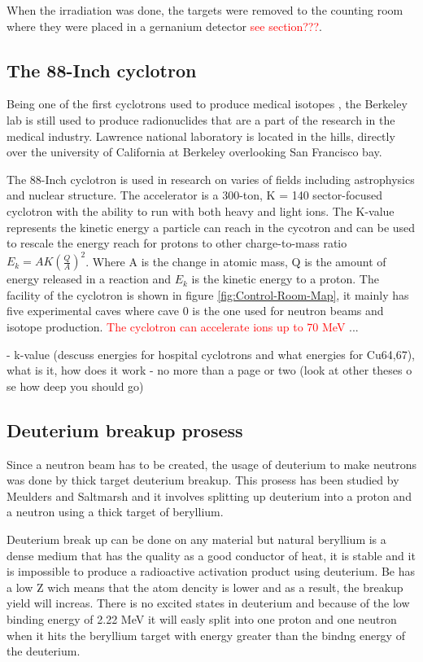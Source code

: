 \documentclass[twoside,english]{uiofysmaster/uiofysmaster}
\begin{document}
When the irradiation was done, the targets were removed to the counting room where they were placed in a gernanium detector \textcolor{red}{see section???}. 

\subsection{The 88-Inch cyclotron}
\label{sec: cyclotron}

Being one of the first cyclotrons used to produce medical isotopes \cite{E.Lawrence}, the Berkeley lab is still used to produce radionuclides that are a part of the research in the medical industry. Lawrence national laboratory is located in the hills, directly over the university of California at Berkeley overlooking San Francisco bay.

The 88-Inch cyclotron is used in research on varies of fields including astrophysics and nuclear structure. The accelerator is a 300-ton, K = 140 sector-focused cyclotron with the ability to run with both heavy and light ions. The K-value represents the kinetic energy a particle can reach in the cycotron and can be used to rescale the energy reach for protons to other charge-to-mass ratio $E_k = A K (\frac{Q}{A})^2 $. Where A is the change in atomic mass, Q is the amount of energy released in a reaction and $E_k$ is the kinetic energy to a proton.
The facility of the cyclotron is shown in figure \ref{fig:Control-Room-Map}, it mainly has five experimental caves where cave 0 is the one used for neutron beams and isotope production. \textcolor{red}{The cyclotron can accelerate ions up to 70 MeV}  ...


- k-value (descuss energies for hospital cyclotrons and what energies for Cu64,67), what is it, how does it work
- no more than a page or two (look at other theses o se how deep you should go)

\subsection{Deuterium breakup prosess}
\label{sec: D_breakup}

Since a neutron beam has to be created, the usage of deuterium to make neutrons was done by  thick target deuterium breakup. This prosess has been studied by Meulders \cite{Meulders} and Saltmarsh \cite{Saltmarsh1977} and it involves splitting up deuterium into a proton and a neutron using a thick target of beryllium.


Deuterium break up can be done on any material but natural beryllium is a dense medium that has the quality as a good conductor of heat, it is stable and it is impossible to produce a radioactive activation product using deuterium. Be has a low Z wich means that the atom dencity is lower and as a result, the breakup yield will increas.  There is no excited states in deuterium \cite{deuterium_decay} and because of the low binding energy of 2.22 MeV it will easly split into one proton and one neutron when it hits the beryllium target with energy greater than the bindng energy of the deuterium.
\end{document}
